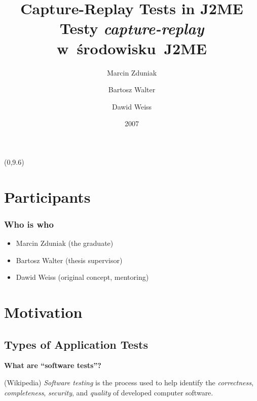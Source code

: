\documentclass[compress]{beamer}
\title{Capture-Replay Tests in J2ME\\[2mm]
{\footnotesize Testy \textit{capture-replay} w~środowisku~J2ME}}
\author{Marcin Zduniak \and Bartosz Walter \and Dawid Weiss}
\institute{Institute of Computing Science\\Poznan University of Technology}
\date{2007}
\begin{document}
\begin{frame}[plain]
    \titlepage

    \begin{textblock}{1}(0,9.6)
    \end{textblock}
\end{frame}


\section{Participants}  %

\begin{frame}
  \frametitle{Who is who}

  \begin{itemize}
      \item Marcin Zduniak (the graduate)
      \item Bartosz Walter (thesis supervisor)
      \item Dawid Weiss (original concept, mentoring)
  \end{itemize}
\end{frame}


\section{Motivation} %

\subsection[Tests]{Types of Application Tests} %

\begin{frame}

    \begin{center}\Large\bfseries
    What are ``software tests''?
    \end{center}

    \pause\bigskip
	\begin{block}{(Wikipedia)}
        \emph{Software testing} is the process used to help identify the \emph{correctness}, 
        \emph{completeness}, \emph{security}, and \emph{quality} of developed computer software.
	\end{block}
\end{frame}
\end{document}
